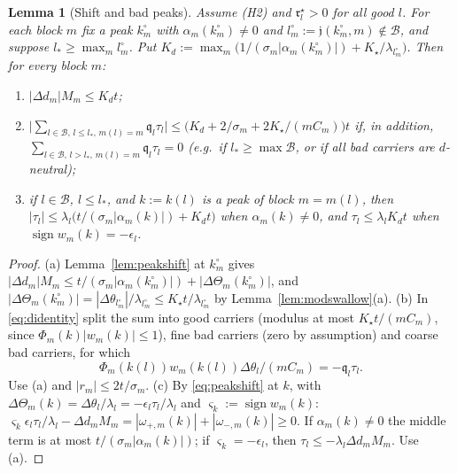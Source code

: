 \documentclass[10pt]{amsart}
\newtheorem{lemma}[theorem]{Lemma}
\theoremstyle{definition}
\theoremstyle{remark}
\newcommand{\sgn}{\operatorname{sign}}
\begin{document}
\begin{lemma}[Shift and bad peaks]\label{lem:badpeaks}
Assume \textup{(H2)} and $\mathfrak r^\star_l>0$ for all good $l$.  For
each block $m$ fix a peak $k^\circ_m$ with $\alpha_m(k^\circ_m)\ne0$ and
$l^\circ_m:=\mathfrak j(k^\circ_m,m)\notin\mathcal B$, and suppose
$l_*\ge\max_ml^\circ_m$.  Put $K_d:=\max_m\big(1/(\sigma_m|\alpha_m
(k^\circ_m)|)+K_\star/\lambda_{l^\circ_m}\big)$.  Then for every block $m$:
\begin{enumerate}
\item[(a)] $|\Delta d_m|M_m\le K_dt$;
\item[(b)] $\big|\sum_{l\in\mathcal B,\,l\le l_*,\,m(l)=m}\mathfrak q_l
\tau_l\big|\le\big(K_d+2/\sigma_m+2K_\star/(mC_m)\big)t$ if, in addition,
$\sum_{l\in\mathcal B,\,l>l_*,\,m(l)=m}\mathfrak q_l\tau_l=0$ \textup{(}e.g.\
if $l_*\ge\max\mathcal B$, or if all bad carriers are $d$-neutral\textup{)};
\item[(c)] if $l\in\mathcal B$, $l\le l_*$, and $k:=k(l)$ is a peak of
block $m=m(l)$, then $|\tau_l|\le\lambda_l\big(t/(\sigma_m|\alpha_m(k)|)+
K_dt\big)$ when $\alpha_m(k)\ne0$, and $\tau_l\le\lambda_lK_dt$ when
$\sgn w_m(k)=-\epsilon_l$.
\end{enumerate}
\end{lemma}

\begin{proof}
(a) Lemma~\ref{lem:peakshift} at $k^\circ_m$ gives $|\Delta d_m|M_m\le
t/(\sigma_m|\alpha_m(k^\circ_m)|)+|\Delta\Theta_m(k^\circ_m)|$, and
$|\Delta\Theta_m(k^\circ_m)|=|\Delta\theta_{l^\circ_m}|/\lambda_{l^\circ_m}\le
K_\star t/\lambda_{l^\circ_m}$ by Lemma~\ref{lem:modswallow}(a).
(b) In \eqref{eq:didentity} split the sum into good carriers (modulus at
most $K_\star t/(mC_m)$, since $\Phi_m(k)|w_m(k)|\le1$), fine bad carriers
(zero by assumption) and coarse bad carriers, for which
\[
 \Phi_m(k(l))w_m(k(l))\Delta\theta_l/(mC_m)=-\mathfrak q_l\tau_l .
\]
Use (a) and $|r_m|\le2t/\sigma_m$.
(c) By \eqref{eq:peakshift} at $k$, with $\Delta\Theta_m(k)=\Delta\theta_l/
\lambda_l=-\epsilon_l\tau_l/\lambda_l$ and $\varsigma_k:=\sgn w_m(k)$:
$\varsigma_k\epsilon_l\tau_l/\lambda_l-\Delta d_mM_m=|\omega_{+,m}(k)|+
|\omega_{-,m}(k)|\ge0$.  If $\alpha_m(k)\ne0$ the middle term is at most
$t/(\sigma_m|\alpha_m(k)|)$; if $\varsigma_k=-\epsilon_l$, then
$\tau_l\le-\lambda_l\Delta d_mM_m$.  Use (a).
\end{proof}
\end{document}
